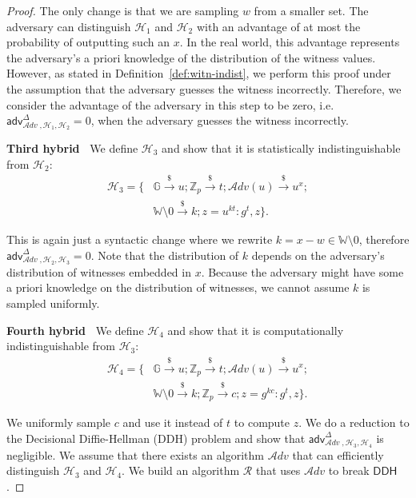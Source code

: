\documentclass[letterpaper,twocolumn,10pt]{article}
\newcommand{\alg}[1]{\mathsf{#1}}
\newcommand{\adv}{\mathcal{A}dv}
\newcommand{\riar}{\xrightarrow{\$}}
\newcommand{\ZZ}{\mathbb{Z}}
\newcommand{\WW}{\mathbb{W}}
\newcommand{\GG}{\mathbb{G}}
\newcommand{\HH}{\mathcal{H}}
\newcommand{\RR}{\mathcal{R}}
\newcommand{\advantage}[2]{\alg{adv}^{#1}_{\adv\;\!,#2}}
\newcommand{\mypara}[1]{\vspace{.5em}\noindent\textbf{{#1}~}}
\begin{document}
\begin{appendices}
\begin{proof}
  The only change is that we are sampling $w$ from a smaller set. The
  adversary can distinguish $\HH_1$ and $\HH_2$ with an advantage of
  at most the probability of outputting such an $x$. In the real
  world, this advantage represents the adversary's a priori knowledge
  of the distribution of the witness values. However, as stated in
  Definition~\ref{def:witn-indist}, we perform this proof under the
  assumption that the adversary guesses the witness
  incorrectly. Therefore, we consider the advantage of the adversary
  in this step to be zero, i.e.
  $\advantage{\Delta}{\HH_1, \HH_2} = 0$, when the adversary guesses the witness incorrectly.

  \mypara{Third hybrid} We define $\HH_3$ and show that it is
  statistically indistinguishable from $\HH_2$:
  \begin{equation}
    \begin{split}
      \HH_3 = \{& \GG \riar u; \ZZ_p \riar t; \adv(u) \riar u^{x}; \\
                & \WW \setminus 0 \riar k; z = u^{kt} : g^t, z \}.
    \end{split}
  \end{equation}

  This is again just a syntactic change where we rewrite
  $k = x - w \in \WW \setminus 0$, therefore
  $\advantage{\Delta}{\HH_2, \HH_3} = 0$. Note that the distribution
  of $k$ depends on the adversary's distribution of witnesses embedded
  in $x$. Because the adversary might have some a priori knowledge on
  the distribution of witnesses, we cannot assume $k$ is sampled uniformly.

  \mypara{Fourth hybrid} We define $\HH_4$ and show that it is
  computationally indistinguishable from $\HH_3$:
  \begin{equation}
    \begin{split}
      \HH_4 = \{& \GG \riar u; \ZZ_p \riar t; \adv(u) \riar u^{x}; \\
                & \WW \setminus 0 \riar k; \ZZ_p \riar c; z = g^{kc} : g^t, z \}.
    \end{split}
  \end{equation}

  We uniformly sample $c$ and use it instead of $t$ to compute $z$. We
  do a reduction to the Decisional Diffie-Hellman (DDH) problem and
  show that $\advantage{\Delta}{\HH_3, \HH_4}$ is negligible. We
  assume that there exists an algorithm $\adv$ that can efficiently
  distinguish $\HH_3$ and $\HH_4$. We build an algorithm $\RR$ that
  uses $\adv$ to break $\mathsf{DDH}$.


\end{proof}
\end{appendices}
\end{document}
